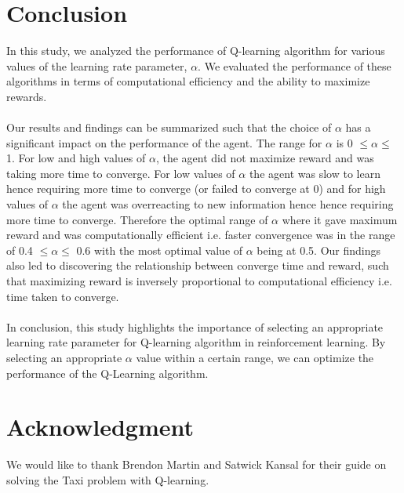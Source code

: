 \documentclass[conference]{IEEEtran}
\begin{document}
 
\section{Conclusion}
 In this study, we analyzed the performance of Q-learning algorithm for various values of the learning rate parameter, $\alpha$. We evaluated the performance of these algorithms in terms of computational efficiency and the ability to maximize rewards. \\ \\ Our results and findings can be summarized such that the choice of $\alpha$ has a significant impact on the performance of the agent. The range for $\alpha$ is 0 $\leq \alpha \leq$ 1. For low and high values of $\alpha$, the agent did not maximize reward and was taking more time to converge. For low values of $\alpha$ the agent was slow to learn hence requiring more time to converge (or failed to converge at 0) and for high values of $\alpha$ the agent was overreacting to new information hence hence requiring more time to converge. Therefore the optimal range of $\alpha$ where it gave maximum reward and was computationally efficient i.e. faster convergence was in the range of 0.4  $\leq \alpha \leq$ 0.6 with the most optimal value of $\alpha$ being at 0.5. Our findings also led to discovering the relationship between converge time and reward, such that maximizing reward is inversely proportional to computational efficiency i.e. time taken to converge. \\ \\ In conclusion, this study highlights the importance of selecting an appropriate learning rate parameter for Q-learning algorithm in reinforcement learning. By selecting an appropriate $\alpha$ value within a certain range, we can optimize the performance of the Q-Learning algorithm. 

\section*{Acknowledgment}
We would like to thank Brendon Martin and Satwick Kansal for their guide \cite{5} on solving the Taxi problem with Q-learning. 
\end{document}
